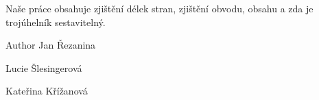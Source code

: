 Naše práce obsahuje zjištění délek stran, zjištění obvodu, obsahu a zda je trojúhelník sestavitelný. \begin{DoxyAuthor}{Author}
Jan Řezanina 

Lucie Šlesingerová 

Kateřina Křížanová 
\end{DoxyAuthor}
